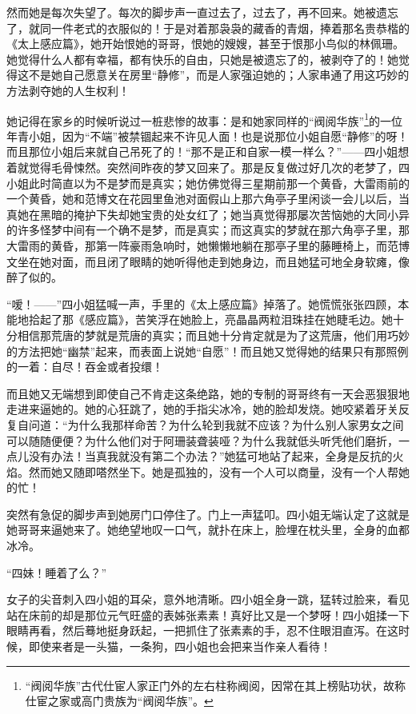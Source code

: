 \par 然而她是每次失望了。每次的脚步声一直过去了，过去了，再不回来。她被遗忘了，就同一件老式的衣服似的！于是对着那袅袅的藏香的青烟，捧着那名贵恭楷的《太上感应篇》，她开始恨她的哥哥，恨她的嫂嫂，甚至于恨那小鸟似的林佩珊。她觉得什么人都有幸福，都有快乐的自由，只她是被遗忘了的，被剥夺了的！她觉得这不是她自己愿意关在房里“静修”，而是人家强迫她的；人家串通了用这巧妙的方法剥夺她的人生权利！
\par 她记得在家乡的时候听说过一桩悲惨的故事：是和她家同样的“阀阅华族”\footnote{“阀阅华族”古代仕宦人家正门外的左右柱称阀阅，因常在其上榜贴功状，故称仕宦之家或高门贵族为“阀阅华族”。}的一位年青小姐，因为“不端”被禁锢起来不许见人面！也是说那位小姐自愿“静修”的呀！而且那位小姐后来就自己吊死了的！“那不是正和自家一模一样么？”——四小姐想着就觉得毛骨悚然。突然间昨夜的梦又回来了。那是反复做过好几次的老梦了，四小姐此时简直以为不是梦而是真实；她仿佛觉得三星期前那一个黄昏，大雷雨前的一个黄昏，她和范博文在花园里鱼池对面假山上那六角亭子里闲谈一会儿以后，当真她在黑暗的掩护下失却她宝贵的处女红了；她当真觉得那屡次苦恼她的大同小异的许多怪梦中间有一个确不是梦，而是真实；而这真实的梦就在那六角亭子里，那大雷雨的黄昏，那第一阵豪雨急响时，她懒懒地躺在那亭子里的藤睡椅上，而范博文坐在她对面，而且闭了眼睛的她听得他走到她身边，而且她猛可地全身软瘫，像醉了似的。
\par “嗳！——”四小姐猛喊一声，手里的《太上感应篇》掉落了。她慌慌张张四顾，本能地拾起了那《感应篇》，苦笑浮在她脸上，亮晶晶两粒泪珠挂在她睫毛边。她十分相信那荒唐的梦就是荒唐的真实；而且她十分肯定就是为了这荒唐，他们用巧妙的方法把她“幽禁”起来，而表面上说她“自愿”！而且她又觉得她的结果只有那照例的一着：自尽！吞金或者投缳！
\par 而且她又无端想到即使自己不肯走这条绝路，她的专制的哥哥终有一天会恶狠狠地走进来逼她的。她的心狂跳了，她的手指尖冰冷，她的脸却发烧。她咬紧着牙关反复自问道：“为什么我那样命苦？为什么轮到我就不应该？为什么别人家男女之间可以随随便便？为什么他们对于阿珊装聋装哑？为什么我就低头听凭他们磨折，一点儿没有办法！当真我就没有第二个办法？”她猛可地站了起来，全身是反抗的火焰。然而她又随即嗒然坐下。她是孤独的，没有一个人可以商量，没有一个人帮她的忙！
\par 突然有急促的脚步声到她房门口停住了。门上一声猛叩。四小姐无端认定了这就是她哥哥来逼她来了。她绝望地叹一口气，就扑在床上，脸埋在枕头里，全身的血都冰冷。
\par “四妹！睡着了么？”
\par 女子的尖音刺入四小姐的耳朵，意外地清晰。四小姐全身一跳，猛转过脸来，看见站在床前的却是那位元气旺盛的表姊张素素！真好比又是一个梦呀！四小姐揉一下眼睛再看，然后蓦地挺身跃起，一把抓住了张素素的手，忍不住眼泪直泻。在这时候，即使来者是一头猫，一条狗，四小姐也会把来当作亲人看待！
